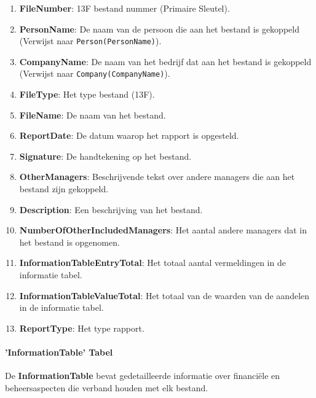 \begin{enumerate}
    \item \textbf{FileNumber}: 13F bestand nummer (Primaire Sleutel).
    \item \textbf{PersonName}: De naam van de persoon die aan het bestand is gekoppeld (Verwijst naar \texttt{Person(PersonName)}).
    \item \textbf{CompanyName}: De naam van het bedrijf dat aan het bestand is gekoppeld (Verwijst naar \texttt{Company(CompanyName)}).
    \item \textbf{FileType}: Het type bestand (13F).
    \item \textbf{FileName}: De naam van het bestand.
    \item \textbf{ReportDate}: De datum waarop het rapport is opgesteld.
    \item \textbf{Signature}: De handtekening op het bestand.
    \item \textbf{OtherManagers}: Beschrijvende tekst over andere managers die aan het bestand zijn gekoppeld.
    \item \textbf{Description}: Een beschrijving van het bestand.
    \item \textbf{NumberOfOtherIncludedManagers}: Het aantal andere managers dat in het bestand is opgenomen.
    \item \textbf{InformationTableEntryTotal}: Het totaal aantal vermeldingen in de informatie tabel.
    \item \textbf{InformationTableValueTotal}: Het totaal van de waarden van de aandelen in de informatie tabel.
    \item \textbf{ReportType}: Het type rapport.
\end{enumerate}

\paragraph{'InformationTable' Tabel}

De \textbf{InformationTable} bevat gedetailleerde informatie over financiële en beheersaspecten die verband houden met elk bestand.


